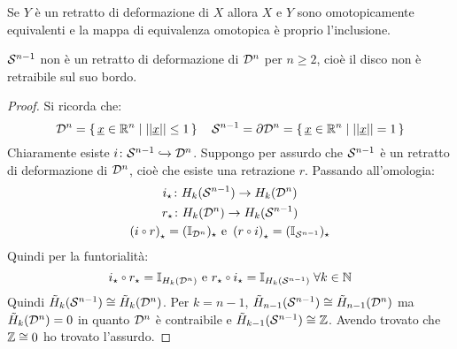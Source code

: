 \begin{osservation}
  Se $ Y $ è un retratto di deformazione di $ X $ allora $ X $ e $ Y $ sono
  omotopicamente equivalenti e la mappa di equivalenza omotopica è proprio
  l'inclusione.
\end{osservation}
\begin{corollary}
  $ \mathcal{S}^{n-1} $ non è un retratto di deformazione di $ \mathcal{D}^{n} $ per $ n \geq 2 $,
  cioè il disco non è retraibile sul suo bordo.
\end{corollary}
\begin{proof}
  Si ricorda che:
  \[
    \mathcal{D}^{n} = \set{ \underline{x} \in \mathbb{R}^{n} | || \underline{x} || \leq 1} \quad \mathcal{S}^{n-1} = \partial \mathcal{D}^{n} = \set{ \underline{x} \in \mathbb{R}^{n} | || \underline{x} || = 1}
  \]
  Chiaramente esiste $ i \colon \mathcal{S}^{n-1} \xhookrightarrow{} \mathcal{D}^{n} $.
  Suppongo per assurdo che $ \mathcal{S}^{n-1} $ è un retratto di deformazione di $ \mathcal{D}^{n} $, cioè che
  esiste una retrazione $ r $. Passando all'omologia:
  \begin{gather*}
    i_\star \colon H_k(\Sph{n-1}) \to H_k(\Disk{n}) \\
    r_\star \colon H_k(\Disk{n}) \to H_k(\Sph{n-1}) \\
    \left( i \circ r \right)_\star = (\Id{\Disk{n}})_\star \text{ e }  \left( r \circ i \right)_\star = (\Id{\Sph{n-1}})_\star
  \end{gather*}
  Quindi per la funtorialità:
  \[
    i_\star \circ r_\star = \Id{H_k(\Disk{n})} \text{ e } r_\star \circ i_\star = \Id{H_k(\Sph{n-1})} \; \forall k \in \mathbb{N}
  \]
  Quindi $ \tilde{H}_k(\mathcal{S}^{n-1}) \cong \tilde{H}_k(\mathcal{D}^{n}) $. Per $ k = n - 1 $,
  $ \tilde{H}_{n-1}(\mathcal{S}^{n-1}) \cong \tilde{H}_{n-1}(\mathcal{D}^{n}) $ ma $ \tilde{H}_k(\mathcal{D}^{n}) = 0 $
  in quanto $ \mathcal{D}^{n} $ è contraibile e $ \tilde{H}_{k-1}(\mathcal{S}^{n-1}) \cong \mathbb{Z} $. Avendo
  trovato che $ \mathbb{Z} \cong 0 $ ho trovato l'assurdo.
\end{proof}

